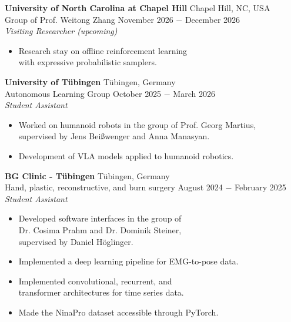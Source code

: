 \documentclass{article}
\begin{document}


\noindent \textbf{University of North Carolina at Chapel Hill}  \hfill Chapel Hill, NC, USA \\
\noindent Group of Prof. Weitong Zhang \hfill November 2026 $-$ December 2026\\
\textit{Visiting Researcher (upcoming)}
\begin{itemize}[noitemsep,nolistsep,leftmargin=*]
    \item Research stay on offline reinforcement learning \\
    with expressive probabilistic samplers.\\
\end{itemize}

\noindent \textbf{University of Tübingen}  \hfill Tübingen, Germany \\
\noindent Autonomous Learning Group  \hfill October 2025 $-$ March 2026\\
\textit{Student Assistant}
\begin{itemize}[noitemsep,nolistsep,leftmargin=*]
    \item Worked on humanoid robots in the group of Prof. Georg Martius, \\
    supervised by Jens Beißwenger and Anna Manasyan.
    \item Development of VLA models applied to humanoid robotics.\\
\end{itemize}

\noindent \textbf{BG Clinic - Tübingen}  \hfill Tübingen, Germany \\
\noindent Hand, plastic, reconstructive, and burn surgery  \hfill August 2024 $-$ February 2025\\
\textit{Student Assistant}
\begin{itemize}[noitemsep,nolistsep,leftmargin=*]
    \item Developed software interfaces in the group of \\
    Dr. Cosima Prahm and Dr. Dominik Steiner, \\
    supervised by Daniel Höglinger.
    \item Implemented a deep learning pipeline for EMG-to-pose data.
    \item Implemented convolutional, recurrent, and \\transformer architectures for time series data.
    \item Made the NinaPro dataset accessible through PyTorch.\\
\end{itemize}
\end{document}
